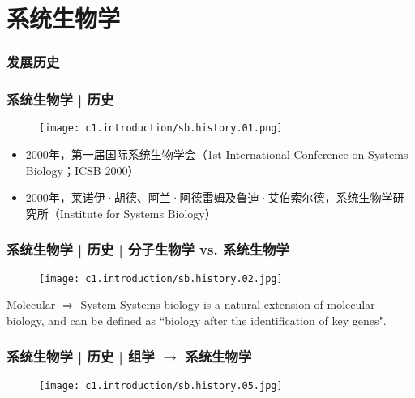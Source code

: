 \section{系统生物学}
\subsubsection{发展历史}
\begin{frame}
  \frametitle{系统生物学 | 历史}
  \begin{figure}
    \centering
    \texttt{[image: c1.introduction/sb.history.01.png]}
  \end{figure}
  \vspace{-1em}
    \begin{itemize}
    \item 2000年，第一届国际系统生物学会（1st International Conference on Systems Biology；ICSB 2000）
    \item 2000年，莱诺伊·胡德、阿兰·阿德雷姆及鲁迪·艾伯索尔德，系统生物学研究所（Institute for Systems Biology）
  \end{itemize}
\end{frame}

\begin{frame}
  \frametitle{系统生物学 | 历史 | 分子生物学 vs. 系统生物学}
  \begin{figure}
    \centering
    \texttt{[image: c1.introduction/sb.history.02.jpg]}
  \end{figure}
  \vspace{-0.8em}
    \begin{block}{Molecular $\Rightarrow$ System}
  Systems biology is a natural extension of molecular biology, and can be defined as ``biology after the identification of key genes".
  \end{block}
\end{frame}

\begin{frame}
  \frametitle{系统生物学 | 历史 | 组学 $\rightarrow$ 系统生物学}
  \begin{figure}
    \centering
    \texttt{[image: c1.introduction/sb.history.05.jpg]}
  \end{figure}
\end{frame}

